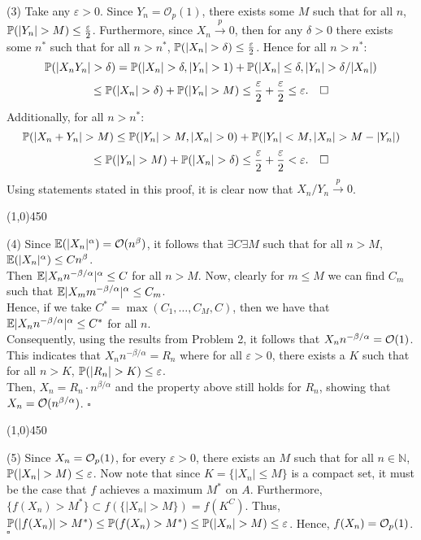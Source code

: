 \documentclass[12pt]{article}
\begin{document}
\noindent
(3) Take any $\varepsilon > 0$. Since $Y_n = \mathcal{O}_p(1)$, there exists some $M$ such that for all $n$, $\prob(|Y_n|>M) \leq \frac{\varepsilon}{2}$. Furthermore, since $X_n \overset{p}\to 0$, then for any $\delta>0$ there exists some $n^*$ such that for all $n>n^*$, $\prob(|X_n|>\delta)\leq \frac{\varepsilon}{2}$. Hence for all $n>n^*$: 
$$\prob(|X_nY_n|>\delta) =\prob(|X_n|>\delta,|Y_n|>1)+\prob(|X_n|\leq\delta,|Y_n|>\delta/|X_n|)$$
$$ \leq \prob(|X_n|>\delta)+\prob(|Y_n|>M) \leq \frac{\varepsilon}{2} + \frac{\varepsilon}{2} \leq \varepsilon. \hspace{10 pt} \square$$
Additionally, for all $n>n^*$:
$$\prob(|X_n+Y_n|>M) \leq \prob(|Y_n| > M, |X_n|>0)+\prob(|Y_n|<M, |X_n| > M-|Y_n|)$$
$$ \leq \prob(|Y_n|>M) + \prob(|X_n|>\delta) \leq \frac{\varepsilon}{2} + \frac{\varepsilon}{2} < \varepsilon. \hspace{10 pt} \square$$
Using statements stated in this proof, it is clear now that $X_n/Y_n \overset{p}\to 0$.
\begin{center}
\line(1,0){450}
\end{center}

\noindent
(4) Since $\mathbb{E}(|X_n|^{\alpha}) = \mathcal{O}(n^\beta)$, it follows that $\exists C \exists M$ such that for all $n>M$, $\mathbb{E}(|X_n|^{\alpha}) \leq C n^{\beta}$.\\
Then $\mathbb{E} |X_nn^{-\beta/\alpha}|^\alpha \leq C$ for all $n>M$.
Now, clearly for $m \leq M$ we can find $C_m$ such that $\mathbb{E} |X_mm^{-\beta/\alpha}|^\alpha \leq C_m$.\\
Hence, if we take $C^* = \max(C_1,\dots,C_M,C)$, then we have that $\mathbb{E} |X_nn^{-\beta/\alpha}|^\alpha \leq C^*$ for all $n$.\\

\noindent
Consequently, using the results from Problem 2, it follows that $X_nn^{-\beta/\alpha} = \mathcal{O}(1)$.
This indicates that $X_nn^{-\beta/\alpha} = R_n$ where for all $\varepsilon>0$, there exists a $K$ such that for all $n>K$, $\prob(|R_n|>K)\leq \varepsilon$.\\
Then, $X_n = R_n \cdot n^{\beta/\alpha}$ and the property above still holds for $R_n$, showing that $X_n = \mathcal{O}(n^{\beta/\alpha})$. $\square$
\begin{center}
\line(1,0){450}
\end{center}

\pagebreak
\noindent
(5) Since $X_n = \mathcal{O}_p(1)$, for every $\varepsilon > 0$, there exists an $M$ such that for all $n \in \mathbb{N}$, $\prob(|X_n|>M) \leq \varepsilon$. Now note that since $K=\{|X_n|\leq M\}$ is a compact set, it must be the case that $f$ achieves a maximum $M^*$ on $A$. Furthermore, $\{f(X_n) > M^*\} \subset f(\{|X_n|>M\}) =f(K^C)$. Thus, $\prob(|f(X_n)|>M^*) \leq \prob(f(X_n)>M^*) \leq \prob(|X_n|>M) \leq \varepsilon$. Hence, $f(X_n) = \mathcal{O}_p(1)$. $\square$\\
\end{document}
